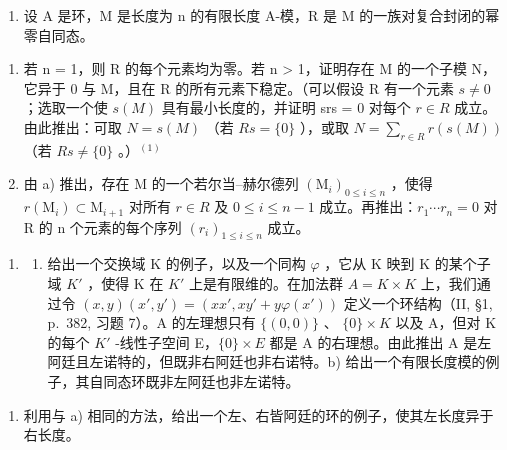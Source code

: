 \begin{enumerate}
\def\labelenumi{\arabic{enumi})}
\setcounter{enumi}{1}
\tightlist
\item
  设 A 是环，M 是长度为 n 的有限长度 A-模，R 是 M 的一族对复合封闭的幂零自同态。
\end{enumerate}

\begin{enumerate}
\def\labelenumi{\alph{enumi})}
\item
  若 n = 1，则 R 的每个元素均为零。若 n \textgreater{} 1，证明存在 M 的一个子模 N，它异于 0 与 M，且在 R 的所有元素下稳定。（可以假设 R 有一个元素 \(s \neq 0\) ；选取一个使 \(s(M)\) 具有最小长度的，并证明 srs = 0 对每个 \(r \in R\) 成立。由此推出：可取 \(N = s(M)\) （若 \(Rs = \{0\}\) ），或取 \(N = \sum_{r \in R} r(s(M))\) （若 \(Rs \neq \{0\}\) 。）\(^{(1)}\)
\item
  由 a) 推出，存在 M 的一个若尔当--赫尔德列 \((\mathrm{M}_{i})_{0\leqslant i\leqslant n}\) ，使得 \(r(\mathrm{M}_{i})\subset\mathrm{M}_{i+1}\) 对所有 \(r\in R\) 及 \(0\leqslant i\leqslant n-1\) 成立。再推出：\(r_{1}\cdots r_{n}=0\) 对 R 的 n 个元素的每个序列 \((r_{i})_{1\leqslant i\leqslant n}\) 成立。
\end{enumerate}

\begin{enumerate}
\def\labelenumi{\arabic{enumi})}
\setcounter{enumi}{2}
\tightlist
\item
  \begin{enumerate}
  \def\labelenumii{\alph{enumii})}
  \tightlist
  \item
    给出一个交换域 K 的例子，以及一个同构 \(\varphi\) ，它从 K 映到 K 的某个子域 \(K'\) ，使得 K 在 \(K'\) 上是有限维的。在加法群 \(A = K \times K\) 上，我们通过令 \((x, y)(x', y') = (xx', xy' + y\varphi(x'))\) 定义一个环结构（II, §1, p.~382, 习题 7）。A 的左理想只有 \(\{(0, 0)\}\) 、 \(\{0\} \times K\) 以及 A，但对 K 的每个 \(K'\) -线性子空间 E，\(\{0\} \times E\) 都是 A 的右理想。由此推出 A 是左阿廷且左诺特的，但既非右阿廷也非右诺特。b) 给出一个有限长度模的例子，其自同态环既非左阿廷也非左诺特。
  \end{enumerate}
\end{enumerate}

\begin{enumerate}
\def\labelenumi{\alph{enumi})}
\setcounter{enumi}{2}
\tightlist
\item
  利用与 a) 相同的方法，给出一个左、右皆阿廷的环的例子，使其左长度异于右长度。
\end{enumerate}

